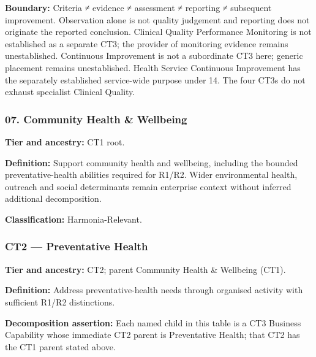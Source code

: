 \textbf{Boundary:} Criteria ≠ evidence ≠ assessment ≠ reporting ≠ subsequent improvement. Observation alone is not quality judgement and reporting does not originate the reported conclusion. Clinical Quality Performance Monitoring is not established as a separate CT3; the provider of monitoring evidence remains unestablished. Continuous Improvement is not a subordinate CT3 here; generic placement remains unestablished. Health Service Continuous Improvement has the separately established service-wide purpose under 14. The four CT3s do not exhaust specialist Clinical Quality.

\label{rad:business:563}
\subsubsection*{07. Community Health \& Wellbeing}
\label{rad:business:565}

\textbf{Tier and ancestry:} CT1 root.

\label{rad:business:567}

\textbf{Definition:} Support community health and wellbeing, including the bounded preventative-health abilities required for R1/\allowbreak{}R2. Wider environmental health, outreach and social determinants remain enterprise context without inferred additional decomposition.

\label{rad:business:569}

\textbf{Classification:} Harmonia-Relevant.

\label{rad:business:571}
\subsubsection*{CT2 — Preventative Health}
\label{rad:business:573}

\textbf{Tier and ancestry:} CT2; parent Community Health \& Wellbeing (CT1).

\label{rad:business:575}

\textbf{Definition:} Address preventative-health needs through organised activity with sufficient R1/\allowbreak{}R2 distinctions.

\label{rad:business:577}

\textbf{Decomposition assertion:} Each named child in this table is a CT3 Business Capability whose immediate CT2 parent is Preventative Health; that CT2 has the CT1 parent stated above.

